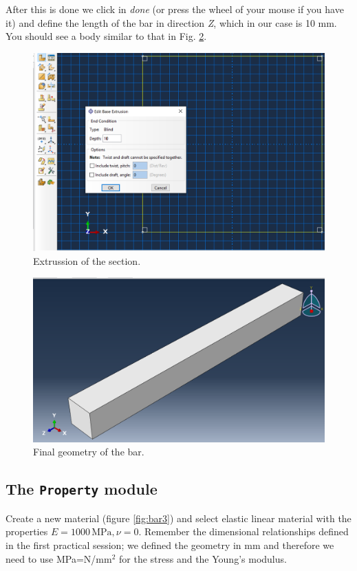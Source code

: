\documentclass[spanish,a4paper,12pt]{article}
\begin{document}
After this is done we click in \emph{done} (or press the wheel of your mouse if you have it) and define the length of the bar in direction \emph{Z}, which in our case is 10 mm. You should see a body similar to that in Fig. \ref{fig:bar2b}.

\begin{figure}[h!tp]
\centering
\includegraphics[scale=0.4]{capturas/sec1.png}
\caption{Extrussion of the section.}
\label{fig:bar2a}
\end{figure}
\begin{figure}[h!tp]
\centering
\includegraphics[scale=0.30]{capturas/sec2.png}
\caption{Final geometry of the bar.}
\label{fig:bar2b}
\end{figure}


\subsection{The \texttt{Property} module}

Create a new material (figure \ref{fig:bar3}) and select elastic linear material with the properties $E=1000\,\text{MPa}, \nu=0$. Remember the dimensional relationships defined in the first practical session; we defined the geometry in mm and therefore we need to use MPa=N/mm$^2$ for the stress and the Young's modulus. 
\end{document}
